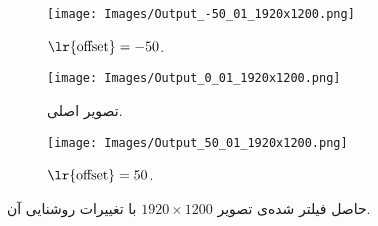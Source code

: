 \documentclass[12pt,onecolumn,a4paper]{article}
\begin{document}
\begin{figure}
     \centering
     \begin{subfigure}[b]{0.3\textwidth}
         \centering
         \texttt{[image: Images/Output\_-50\_01\_1920x1200.png]}
         \caption{$\text{\lr{offset}}=-50$.}
         \label{Figure:Output_01_1920x1200_-50}
     \end{subfigure}
     \hfill
     \begin{subfigure}[b]{0.3\textwidth}
         \centering
         \texttt{[image: Images/Output\_0\_01\_1920x1200.png]}
         \caption{تصویر اصلی.}
         \label{Figure:Output_01_1920x1200_0}
     \end{subfigure}
     \hfill
     \begin{subfigure}[b]{0.3\textwidth}
         \centering
         \texttt{[image: Images/Output\_50\_01\_1920x1200.png]}
         \caption{$\text{\lr{offset}}=50$.}
         \label{Figure:Output_01_1920x1200_50}
     \end{subfigure}
\caption{حاصل فیلتر شده‌ی تصویر $1920 \times 1200$ با تغییرات روشنایی آن.}
\label{Figure:Output_01_1920x1200}
\end{figure}
\end{document}
